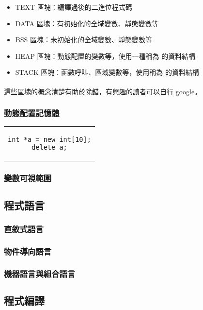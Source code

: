 \documentclass[12pt,a4paper,oneside]{report}
\begin{document}
\begin{CJK}{UTF8}{bkai}
\begin{itemize}
\item TEXT 區塊：編譯過後的二進位程式碼
\item DATA 區塊：有初始化的全域變數、靜態變數等
\item BSS 區塊：未初始化的全域變數、靜態變數等
\item HEAP 區塊：動態配置的變數等，使用一種稱為 的資料結構
\item STACK 區塊：函數呼叫、區域變數等，使用稱為 的資料結構
\end{itemize}

\paragraph{}這些區塊的概念清楚有助於除錯，有興趣的讀者可以自行 google。

\subsubsection{動態配置記憶體}

\begin{code}[h!]
\centering
\begin{tabular}{c}
\begin{lstlisting}
int *a = new int[10];
delete a;
\end{lstlisting}
\end{tabular}
\end{code}

\subsubsection{變數可視範圍}

\subsection{程式語言}

\subsubsection{直敘式語言}
\subsubsection{物件導向語言}
\subsubsection{機器語言與組合語言}

\subsection{程式編譯}

\ifx \allfiles \undefined

\printindex

\clearpage
\end{CJK}
\end{document}
